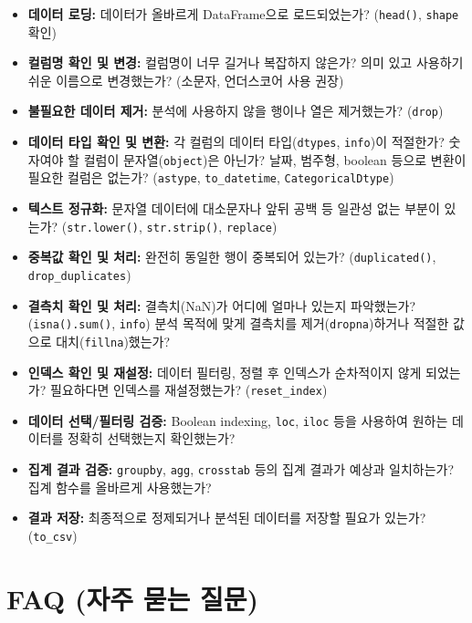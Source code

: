 \documentclass[11pt,a4paper]{book}
\theoremstyle{definition}
\begin{document}
\begin{itemize}
    \item[\checkmark] \textbf{데이터 로딩:} 데이터가 올바르게 DataFrame으로 로드되었는가? (\texttt{head()}, \texttt{shape} 확인)
    \item[\checkmark] \textbf{컬럼명 확인 및 변경:} 컬럼명이 너무 길거나 복잡하지 않은가? 의미 있고 사용하기 쉬운 이름으로 변경했는가? (소문자, 언더스코어 사용 권장)
    \item[\checkmark] \textbf{불필요한 데이터 제거:} 분석에 사용하지 않을 행이나 열은 제거했는가? (\texttt{drop})
    \item[\checkmark] \textbf{데이터 타입 확인 및 변환:} 각 컬럼의 데이터 타입(\texttt{dtypes}, \texttt{info})이 적절한가? 숫자여야 할 컬럼이 문자열(\texttt{object})은 아닌가? 날짜, 범주형, boolean 등으로 변환이 필요한 컬럼은 없는가? (\texttt{astype}, \texttt{to\_datetime}, \texttt{CategoricalDtype})
    \item[\checkmark] \textbf{텍스트 정규화:} 문자열 데이터에 대소문자나 앞뒤 공백 등 일관성 없는 부분이 있는가? (\texttt{str.lower()}, \texttt{str.strip()}, \texttt{replace})
    \item[\checkmark] \textbf{중복값 확인 및 처리:} 완전히 동일한 행이 중복되어 있는가? (\texttt{duplicated()}, \texttt{drop\_duplicates})
    \item[\checkmark] \textbf{결측치 확인 및 처리:} 결측치(NaN)가 어디에 얼마나 있는지 파악했는가? (\texttt{isna().sum()}, \texttt{info}) 분석 목적에 맞게 결측치를 제거(\texttt{dropna})하거나 적절한 값으로 대치(\texttt{fillna})했는가?
    \item[\checkmark] \textbf{인덱스 확인 및 재설정:} 데이터 필터링, 정렬 후 인덱스가 순차적이지 않게 되었는가? 필요하다면 인덱스를 재설정했는가? (\texttt{reset\_index})
    \item[\checkmark] \textbf{데이터 선택/필터링 검증:} Boolean indexing, \texttt{loc}, \texttt{iloc} 등을 사용하여 원하는 데이터를 정확히 선택했는지 확인했는가?
    \item[\checkmark] \textbf{집계 결과 검증:} \texttt{groupby}, \texttt{agg}, \texttt{crosstab} 등의 집계 결과가 예상과 일치하는가? 집계 함수를 올바르게 사용했는가?
    \item[\checkmark] \textbf{결과 저장:} 최종적으로 정제되거나 분석된 데이터를 저장할 필요가 있는가? (\texttt{to\_csv})
\end{itemize}


\section{FAQ (자주 묻는 질문)}
\end{document}
